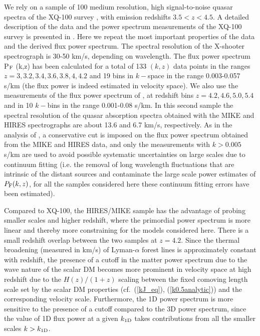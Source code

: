 \documentclass[11pt,nofootinbib]{article}
\numberwithin{equation}{section}
\begin{document}
We rely on a sample of 100 medium resolution,
high signal-to-noise quasar spectra of the XQ-100 survey \cite{lopez16}, with
emission redshifts $3.5 < z < 4.5$.  A detailed description of
the data and the power spectrum measurements of the XQ-100 survey is 
presented in \cite{Irsic:2017sop}.  Here we repeat the most important
properties of the data and the derived flux power spectrum.  The
spectral resolution of the X-shooter spectrograph is 30-50 km/s,
depending on wavelength.  The flux power spectrum P$_{\rm F}$ (k,z)
has been calculated for a total of 133 $(k,z)$ data points in the
ranges $z=3,3.2,3.4,3.6,3.8,4,4.2$ and 19 bins in $k-$space in the
range 0.003-0.057 s/km (the flux power is indeed estimated in velocity space).  We also use the measurements of the flux
power spectrum of \cite{Viel:2013apy}, at redshift bins
$z=4.2,4.6,5.0,5.4$ and in 10 $k-$bins in the range 0.001-0.08 s/km.
In this second sample the spectral resolution of the quasar absorption
spectra obtained with the MIKE and HIRES spectrographs are about 13.6
and 6.7 km/s, respectively.  As in the analysis of \cite{Viel:2013apy},
a conservative cut is imposed on the flux power spectrum obtained from
the MIKE and HIRES data, and only the measurements with $k >
0.005$   s/km are used to avoid possible systematic uncertainties on
large scales due to continuum fitting (i.e. the removal of long wavelength fluctuations
that are intrinsic of the distant sources and contaminate the large scale power estimates
of $P_{\rm F}(k,z)$, for all the samples considered here these continuum fitting errors
have been estimated).

Compared to XQ-100, the HIRES/MIKE sample has the advantage of probing
smaller scales and higher redshift, where the primordial power spectrum is more linear
and thereby more constraining for the models considered here.  There is a small redshift overlap
between the two samples at $z=4.2$. Since the thermal broadening
(measured in km/s) of Lyman-$\alpha$ forest lines is approximately constant
with redshift, the presence of a cutoff in the matter power spectrum
due to the wave nature of the scalar DM
becomes more prominent in velocity space at high
redshift due to the $H(z)/(1+z)$ scaling between the fixed comoving
length scale set by the scalar DM properties (cf.~(\ref{kJ_eq}),
(\ref{k0.5analytic})) and the corresponding 
velocity scale.  Furthermore, the 1D power spectrum is more sensitive to
the presence of a cutoff compared to the 3D power spectrum, since the value of 1D flux power 
at a given $k_{\rm 1D}$ takes contributions from all the smaller scales $k> k_{\rm 1D}$.
\end{document}
